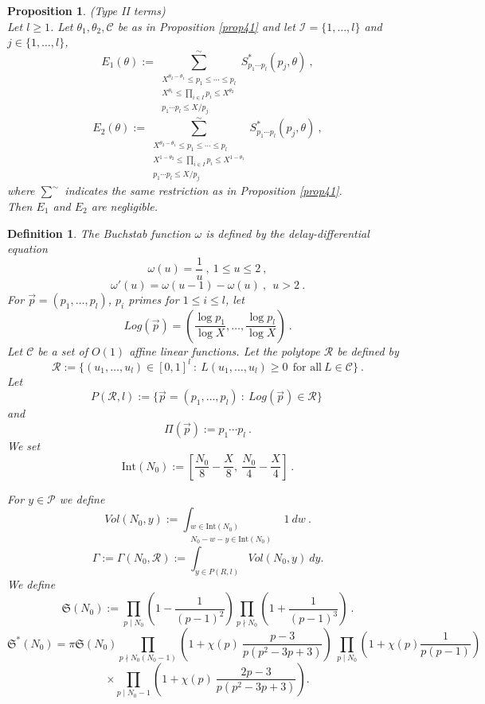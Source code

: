 \documentclass{amsart}
\newtheorem{proposition}[theorem]{Proposition}
\numberwithin{equation}{subsection}
\newtheorem{definition}[theorem]{Definition}
\begin{document}
\begin{proposition}\label{prop42} (Type II terms)\\
Let $l\geq 1$. Let $\theta_1, \theta_2, \mathcal{C}$ be as in Proposition \ref{prop41} and let $\mathcal{I}=\{1,\ldots, l\}$ and \mbox{$j\in\{1,\ldots, l\}$,}
$$E_1(\theta):=\sum_{\substack{X^{\theta_2-\theta_1}\leq p_1\leq \cdots \leq p_l \\ X^{\theta_1}\leq \prod_{i\in I}p_i\leq X^{\theta_2}\\ p_1\cdots p_l\leq X/p_j}}^{\sim}  S^*_{p_1\cdots p_l}(p_j,\theta)\:,$$
%
$$E_2(\theta):=\sum_{\substack{X^{\theta_2-\theta_1}\leq p_1\leq \cdots \leq p_l \\ X^{1-\theta_2}\leq \prod_{i\in I}p_i\leq X^{1-\theta_1}\\ p_1\cdots p_l\leq X/p_j}}^{\sim}  S^*_{p_1\cdots p_l}(p_j,\theta)\:,$$
where $\sum^{\sim}$ indicates the same restriction as in Proposition \ref{prop41}.\\
Then $E_1$ and $E_2$ are negligible.
\end{proposition}


\begin{definition}\label{def42}
The Buchstab function $\omega$ is defined by the delay-differential equation
$$\omega(u)=\frac{1}{u}\:,\ 1\leq u\leq 2\:,$$
$$\omega'(u)=\omega(u-1)-\omega(u)\:,\ \ u>2\:.$$
For $\vec{p}=(p_1,\ldots,p_l)$, $p_i$ primes for $1\leq i \leq l$, let
$$Log(\vec{p})=\left(\frac{\log p_1}{\log X},\ldots, \frac{\log p_l}{\log X}\right)\:.$$
Let $\mathcal{C}$ be a set of $O(1)$ affine linear functions. Let the polytope $\mathcal{R}$ be defined by
$$\mathcal{R}:=\{(u_1, \ldots, u_l)\in[0,1]^l\::\: L(u_1,\ldots, u_l)\geq 0\ \ \text{for all}\ L\in\mathcal{C}\}\:.$$
Let 
$$P(\mathcal{R}, l):=\{\vec{p}=(p_1, \ldots, p_l)\::\: Log(\vec{p})\in \mathcal{R}\}\:$$
and
$$\Pi(\vec{p}):=p_1\cdots p_l\:.$$
We set
$$\text{Int}(N_0):=\left[ \frac{N_0}{8}-\frac{X}{8},\ \frac{N_0}{4}-\frac{X}{4} \right]\:.$$

For $y\in\mathcal{P}$ we define
$$Vol(N_0, y):=\int_{\substack{w\in \text{Int}(N_0)\\ N_0-w-y\in \text{Int}(N_0) }} 1\: dw\:.$$
$$\Gamma:=\Gamma(N_0, \mathcal{R}):=\int_{y\in{P}(R,l)}Vol(N_0,y)\: dy.$$
We define
$$\mathfrak{S}(N_0):=\prod_{p\mid N_0}\left(1-\frac{1}{(p-1)^2}\right)\prod_{p\nmid N_0}\left(1+\frac{1}{(p-1)^3}\right)\:.$$
$$\mathfrak{S}^*(N_0)=\pi \mathfrak{S}(N_0) \prod_{p\nmid N_0(N_0-1)} \left(1+\chi(p)\: \frac{p-3}{p(p^2-3p+3)}\right)\ \prod_{p\mid N_0} \left(1+\chi(p)\frac{1}{p(p-1)}\right)$$
$$\times \prod_{p\mid N_0-1}\left(1+\chi(p)\:\frac{2p-3}{p(p^2-3p+3)}\right).$$

\end{definition}
\end{document}
